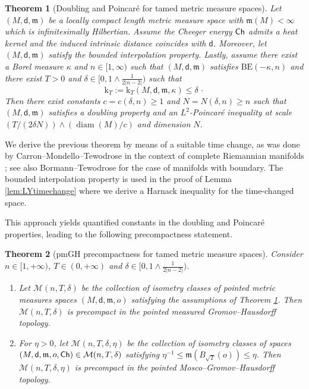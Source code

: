 \documentclass[10pt]{article}
\newcommand{\m}{\mathfrak{m}}
\newcommand{\M}{{\mathit{M}}}
\DeclareMathOperator{\diam}{diam}
\renewcommand{\k}{\mathrm{k}}
\newcommand{\dist}{\mathsf{d}}
\newcommand{\Ch}{{\sf Ch}}
\newcommand{\BE}{{\mathrm{BE}}}
\theoremstyle{plain}
\newtheorem{theorem}{Theorem}[section]
\theoremstyle{definition}
\begin{document}
\begin{theorem}[Doubling and Poincaré for tamed metric measure spaces]\label{thm:MainA} 
Let $(\M,\dist,\m)$ be a locally compact length metric measure space with $\m(M)<\infty$ which is infinitesimally Hilbertian. Assume the Cheeger energy $\Ch$ admits a heat kernel and the induced intrinsic distance coincides with $\dist$. Moreover, let $(\M,\dist,\m)$ satisfy the bounded interpolation property. Lastly, assume there exist a Borel measure $\kappa$ and $n\in [1,\infty)$ such that $(\M,\dist,\m)$ satisfies $\BE(-\kappa,n)$ and there exist $T>0$ and $\delta \in [0, 1\wedge \frac{1}{2|n-2|})$ such that
\begin{equation*}
\k_T:=\k_T(\M,\dist,\m,\kappa) \le \delta \, \cdot 
\end{equation*}
Then there exist constants $c=c(\delta,n)\geq 1$ and $N = N(\delta,n) \geq n$ such that $(M,\dist,\m)$ satisfies a doubling property and an $L^2$-Poincaré inequality at scale $(T/(2\delta N))\wedge (\diam(\M)/c)$ and dimension $N$.
\end{theorem}

We derive the previous theorem by means of a suitable time change, as was done by Carron--Mondello--Tewodrose in the context of complete Riemannian manifolds \cite{CMT_KatoBE}; see also Bormann--Tewodrose \cite{BormannTewodrose} for the case of manifolds with boundary. The bounded interpolation property is used in the proof of Lemma \ref{lem:LYtimechange} where we derive a Harnack inequality for the time-changed space.

This approach yields quantified constants in the doubling and Poincaré properties, leading to the following precompactness statement.


\begin{theorem}[pmGH precompactness for tamed metric measure spaces]\label{th:MainB}
Consider $n \in [1,+\infty)$, $T \in (0,+\infty)$ and  $\delta \in [0, 1\wedge \frac{1}{2|n-2|})$.

\begin{enumerate}
    \item Let $\mathcal{M}(n,T,\delta)$ be the collection of isometry classes of pointed metric measures spaces $(M,\dist,\m,o)$ satisfying the assumptions of Theorem \ref{thm:MainA}. Then $\mathcal{M}(n,T,\delta)$ is precompact in the pointed measured Gromov--Hausdorff topology.
    \item For $\eta >0$, let $\mathcal{M}(n,T,\delta,\eta)$ be the collection of isometry classes of spaces $(M,\dist,\m,o,\Ch) \in \mathcal{M}(n,T,\delta)$ satisfying $\eta^{-1} \le \m(B_{\sqrt{T}}(o)) \le \eta$. Then $\mathcal{M}(n,T,\delta,\eta)$ is precompact in the pointed Mosco--Gromov--Hausdorff topology.
\end{enumerate}
\end{theorem}
\end{document}
